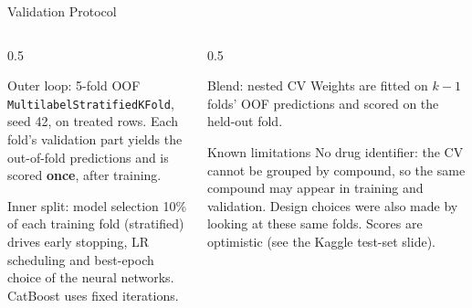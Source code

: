 \documentclass[9pt,aspectratio=169]{beamer}
\begin{document}
\begin{frame}{Validation Protocol}
  \begin{columns}[T]
    \begin{column}{0.5\textwidth}
      \begin{block}{Outer loop: 5-fold OOF}
        \texttt{MultilabelStratifiedKFold}, seed 42, on treated rows. Each fold's validation part yields the out-of-fold predictions and is scored \textbf{once}, after training.
      \end{block}
      \begin{block}{Inner split: model selection}
        10\% of each training fold (stratified) drives early stopping, LR scheduling and best-epoch choice of the neural networks. CatBoost uses fixed iterations.
      \end{block}
    \end{column}
    \begin{column}{0.5\textwidth}
      \begin{block}{Blend: nested CV}
        Weights are fitted on $k-1$ folds' OOF predictions and scored on the held-out fold.
      \end{block}
      \begin{alertblock}{Known limitations}
        No drug identifier: the CV cannot be grouped by compound, so the same compound may appear in training and validation. Design choices were also made by looking at these same folds. Scores are optimistic (see the Kaggle test-set slide).
      \end{alertblock}
    \end{column}
  \end{columns}
\end{frame}
\end{document}
